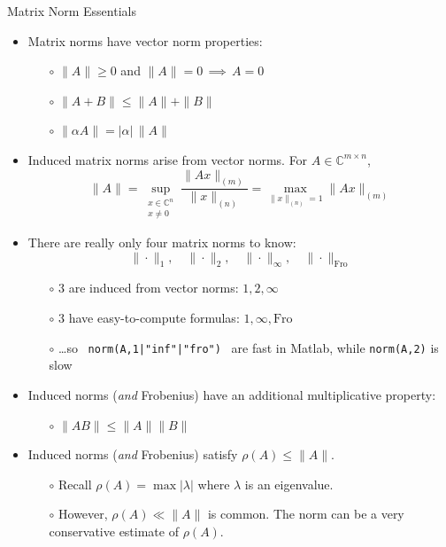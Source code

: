 \documentclass{amsart}
\newcommand{\CC}{\mathbb{C}}
\newcommand{\alert}[1]{{\color{red} #1}}
\begin{document}
\Huge
\centerline{Matrix Norm Essentials}

\thispagestyle{empty}

\bigskip\bigskip
\LARGE
\begin{itemize}
\setlength\itemsep{1em}
\item Matrix norms have vector norm \alert{properties}:
  \begin{itemize}
  \item[$\circ$] $\|A\| \ge 0$ and $\|A\|=0 \,\implies \,A=0$
  \item[$\circ$] $\|A+B\| \le \|A\| + \|B\|$
  \item[$\circ$] $\|\alpha A\| = |\alpha|\,\|A\|$
  \end{itemize}
\item \alert{Induced matrix norms} arise from vector norms.  For $A\in\CC^{m\times n}$,
	$$\|A\| = \sup_{\begin{smallmatrix} x\in\CC^n \\ x\ne 0 \end{smallmatrix}} \frac{\|Ax\|_{(m)}}{\|x\|_{(n)}} = \max_{\|x\|_{(n)}=1} \|Ax\|_{(m)}$$
\item There are really only \alert{four} matrix norms to know:
  $$\|\cdot\|_1, \quad \|\cdot\|_2, \quad \|\cdot\|_\infty, \quad \|\cdot\|_{\mathrm{Fro}}$$
  \begin{itemize}
  \item[$\circ$] 3 are \alert{induced} from vector norms: \quad $1,2,\infty$
  \item[$\circ$] 3 have \alert{easy-to-compute formulas}: \quad $1,\infty,\mathrm{Fro}$
  \item[$\circ$] \dots so \, \texttt{norm(A,1|"inf"|"fro")} \, are fast in Matlab, while \texttt{norm(A,2)} is slow
  \end{itemize}
\item Induced norms (\emph{and} Frobenius) have an additional \alert{multiplicative} property:
  \begin{itemize}
  \item[$\circ$] $\|A B\|\le \|A\|\|B\|$
  \end{itemize}
\item Induced norms (\emph{and} Frobenius) satisfy \alert{$\rho(A)\le \|A\|$}.
  \begin{itemize}
  \item[$\circ$] Recall $\rho(A) = \max |\lambda|$ where $\lambda$ is an eigenvalue.
  \item[$\circ$] However, $\rho(A)\ll\|A\|$ is common.  The norm can be a very conservative estimate of $\rho(A)$.

\end{itemize}
\end{itemize}
\end{document}

